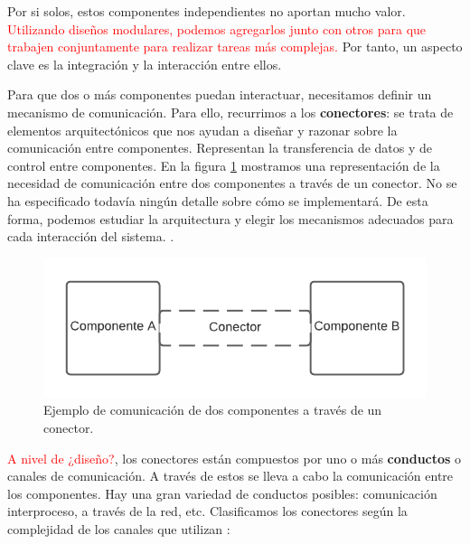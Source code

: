 Por si solos, estos componentes independientes no aportan mucho valor. \textcolor{red}{Utilizando diseños modulares, podemos agregarlos junto con otros para que trabajen conjuntamente para realizar tareas más complejas.} Por tanto, un aspecto clave es la integración y la interacción entre ellos. \cite{mehtaTaxonomySoftwareConnectors2000}

Para que dos o más componentes puedan interactuar, necesitamos definir un mecanismo de comunicación. Para ello, recurrimos a los \textbf{conectores}: se trata de elementos arquitectónicos que nos ayudan a diseñar y razonar sobre la comunicación entre componentes. Representan la transferencia de datos y de control entre componentes. En la figura \ref{fig:componentesEjemplo} mostramos una representación de la necesidad de comunicación entre dos componentes a través de un conector. No se ha especificado todavía ningún detalle sobre cómo se implementará. De esta forma, podemos estudiar la arquitectura y elegir los mecanismos adecuados para cada interacción del sistema. \cite{taylorSoftwareArchitectureFoundations2009}.


\begin{figure}[h!]
  \centering
  \includegraphics[scale=0.78]{02_arquitectura/images/conector}
  \caption{Ejemplo de comunicación de dos componentes a través de un conector.}
  \label{fig:componentesEjemplo}
\end{figure}

\textcolor{red}{A nivel de ¿diseño?}, los conectores están compuestos por uno o más \textbf{conductos} o canales de comunicación. A través de estos se lleva a cabo la comunicación entre los componentes. Hay una gran variedad de conductos posibles: comunicación interproceso, a través de la red, etc. Clasificamos los conectores según la complejidad de los canales que utilizan \cite{mehtaTaxonomySoftwareConnectors2000}:

